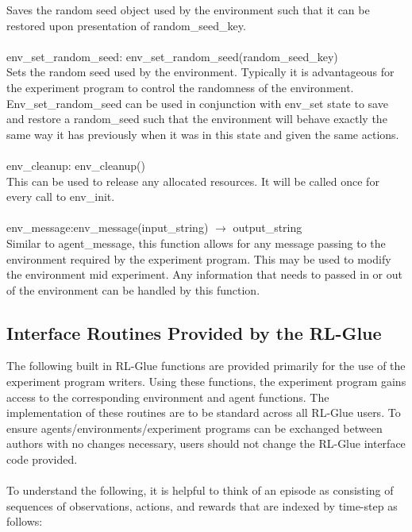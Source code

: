 \documentclass[11pt]{article}
\begin{document}
Saves the random seed object used by the environment such that it can be restored upon presentation of random\_seed\_key.
\\\\
env\_set\_random\_seed: env\_set\_random\_seed(random\_seed\_key)\\
Sets the random seed used by the environment. Typically it is advantageous for the experiment program to control the randomness of the environment. Env\_set\_random\_seed can be used in conjunction with env\_set state to save and restore a random\_seed such that the environment will behave exactly the same way it has previously when it was in this state and given the same actions.
\\\\                       
env\_cleanup: env\_cleanup()\\
This can be used to release any allocated resources. It will be called once for every call to env\_init.
\\\\
env\_message:env\_message(input\_string) $\rightarrow$ output\_string\\
Similar to agent\_message, this function allows for any message passing to the environment required by the experiment program. This may be used to modify the environment mid experiment. Any information that needs to passed in or out of the environment can be handled by this function.


\subsection{Interface Routines Provided by the RL-Glue}

The following built in RL-Glue functions are provided primarily for the use of the experiment program writers. Using these functions, the experiment program gains access to the corresponding environment and agent functions. The implementation of these routines are to be standard across all RL-Glue users. To ensure agents/environments/experiment programs can be exchanged between authors with no changes necessary, users should not change the RL-Glue interface code provided.
\\\\      
To understand the following, it is helpful to think of an episode as consisting of sequences of observations, actions, and rewards that are indexed by time-step as follows:
\end{document}
